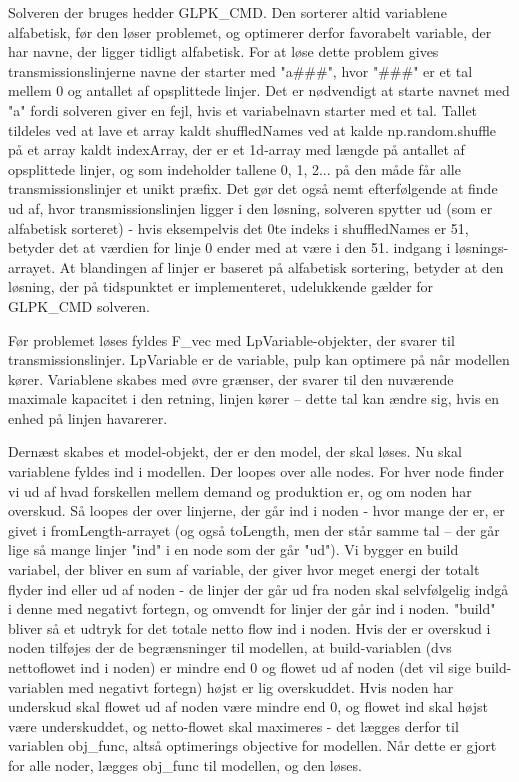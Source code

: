 \documentclass{article}
\begin{document}
Solveren der bruges hedder GLPK\_CMD. Den sorterer altid variablene alfabetisk, før den løser problemet, og optimerer derfor favorabelt variable, der har navne, der ligger tidligt alfabetisk. For at løse dette problem gives transmissionslinjerne navne der starter med "a\#\#\#", hvor "\#\#\#" er et tal mellem 0 og antallet af opsplittede linjer. Det er nødvendigt at starte navnet med "a" fordi solveren giver en fejl, hvis et variabelnavn starter med et tal. Tallet tildeles ved at lave et array kaldt shuffledNames ved at kalde np.random.shuffle på et array kaldt indexArray, der er et 1d-array med længde på antallet af opsplittede linjer, og som indeholder tallene 0, 1, 2... på den måde får alle transmissionslinjer et unikt præfix. Det gør det også nemt efterfølgende at finde ud af, hvor transmissionslinjen ligger i den løsning, solveren spytter ud (som er alfabetisk sorteret) - hvis eksempelvis det 0te indeks i shuffledNames er 51, betyder det at værdien for linje 0 ender med at være i den 51. indgang i løsnings-arrayet. At blandingen af linjer er baseret på alfabetisk sortering, betyder at den løsning, der på tidspunktet er implementeret, udelukkende gælder for GLPK\_CMD solveren.

Før problemet løses fyldes F\_vec med LpVariable-objekter, der svarer til transmissionslinjer. LpVariable er de variable, pulp kan optimere på når modellen kører. Variablene skabes med øvre grænser, der svarer til den nuværende maximale kapacitet i den retning, linjen kører -- dette tal kan ændre sig, hvis en enhed på linjen havarerer.

Dernæst skabes et model-objekt, der er den model, der skal løses. Nu skal variablene fyldes ind i modellen. Der loopes over alle nodes. For hver node finder vi ud af hvad forskellen mellem demand og produktion er, og om noden har overskud. Så loopes der over linjerne, der går ind i noden - hvor mange der er, er givet i fromLength-arrayet (og også toLength, men der står samme tal -- der går lige så mange linjer "ind" i en node som der går "ud"). Vi bygger en build variabel, der bliver en sum af variable, der giver hvor meget energi der totalt flyder ind eller ud af noden - de linjer der går ud fra noden skal selvfølgelig indgå i denne med negativt fortegn, og omvendt for linjer der går ind i noden. "build" bliver så et udtryk for det totale netto flow ind i noden. Hvis der er overskud i noden tilføjes der de begrænsninger til modellen, at build-variablen (dvs nettoflowet ind i noden) er mindre end 0 og flowet ud af noden (det vil sige build-variablen med negativt fortegn) højst er lig overskuddet. Hvis noden har underskud skal flowet ud af noden være mindre end 0, og flowet ind skal højst være underskuddet, og netto-flowet skal maximeres - det lægges derfor til variablen obj\_func, altså optimerings objective for modellen. Når dette er gjort for alle noder, lægges obj\_func til modellen, og den løses.
\end{document}
